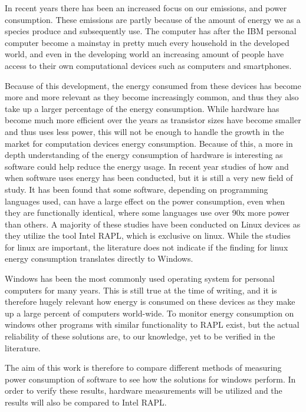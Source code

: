 In recent years there has been an increased focus on our emissions, and power consumption. These emissions are partly because of the amount of energy we as a species produce and subsequently use. 
The computer has after the IBM personal computer become a mainstay in pretty much every household in the developed world, and even in the developing world an increasing amount of people have access to their own computational devices such as computers and smartphones\cite{DevelopedWorldPC}. 

Because of this development, the energy consumed from these devices has become more and more relevant as they become increasingly common, and thus they also take up a larger percentage of the energy consumption. 
While hardware has become much more efficient over the years as transistor sizes have become smaller and thus uses less power, this will not be enough to handle the growth in the market for computation devices energy consumption. Because of this, a more in depth understanding of the energy consumption of hardware is interesting as software could help reduce the energy usage\cite{somavat2011energy}. 
In recent year studies of how and when software uses energy has been conducted, but it is still a very new field of study. It has been found that some software, depending on programming languages used, can have a large effect on the power consumption, even when they are functionally identical, where some languages use over 90x more power than others.
A majority of these studies have been conducted on Linux devices as they utilize the tool Intel RAPL, which is exclusive on linux. While the studies for linux are important, the literature does not indicate if the finding for linux energy consumption translates directly to Windows\cite{Pereira2017}. 

Windows has been the most commonly used operating system for personal computers for many years. This is still true at the time of writing, and it is therefore hugely relevant how energy is consumed on these devices as they make up a large percent of computers world-wide\cite{OSShare}. To monitor energy consumption on windows other programs with similar functionality to RAPL exist, but the actual reliability of these solutions are, to our knowledge, yet to be verified in the literature.

The aim of this work is therefore to compare different methods of measuring power consumption of software to see how the solutions for windows perform. 
In order to verify these results, hardware measurements will be utilized and the results will also be compared to Intel RAPL.

